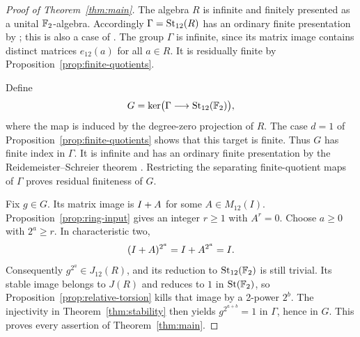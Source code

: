 \begin{proof}[Proof of Theorem~\ref{thm:main}]
The algebra $R$ is infinite and finitely presented as a unital
$\mathbb F_2$-algebra. Accordingly $\Gamma=\operatorname{St}_{12}(R)$ has an ordinary
finite presentation by \cite[Theorem~4.1]{Companion}; this is also a
case of \cite[Theorem~3]{KrsticMcCool}. The group $\Gamma$ is
infinite, since its matrix image contains distinct matrices
$e_{12}(a)$ for all $a\in R$. It is residually finite by
Proposition~\ref{prop:finite-quotients}.

Define
\[
 G=\ker\bigl(\Gamma\longrightarrow\operatorname{St}_{12}(\mathbb F_2)\bigr),
\]
where the map is induced by the degree-zero projection of $R$.
The case $d=1$ of Proposition~\ref{prop:finite-quotients} shows
that this target is finite. Thus $G$ has finite index in $\Gamma$.
It is infinite and has an ordinary finite presentation by the
Reidemeister--Schreier theorem \cite[Chapter~II, Section~4]{LyndonSchupp}. Restricting the
separating finite-quotient maps of $\Gamma$ proves residual finiteness
of $G$.

Fix $g\in G$. Its matrix image is $I+A$ for some
$A\in M_{12}(I)$. Proposition~\ref{prop:ring-input} gives an integer
$r\ge1$ with $A^r=0$. Choose $a\ge0$ with $2^a\ge r$.
In characteristic two,
\[
 (I+A)^{2^a}=I+A^{2^a}=I.
\]
Consequently $g^{2^a}\in J_{12}(R)$, and its reduction to
$\operatorname{St}_{12}(\mathbb F_2)$ is still trivial. Its stable image belongs to
$J(R)$ and reduces to $1$ in $\operatorname{St}(\mathbb F_2)$, so
Proposition~\ref{prop:relative-torsion} kills that image by a
2-power $2^b$. The injectivity in Theorem~\ref{thm:stability}
then yields $g^{2^{a+b}}=1$ in $\Gamma$, hence in $G$.
This proves every assertion of Theorem~\ref{thm:main}.
\end{proof}
